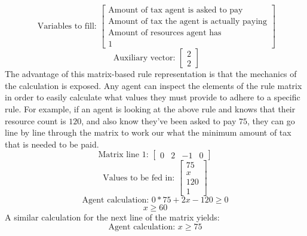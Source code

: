 \begin{equation}
    \textrm{   Variables to fill:  }
    \begin{bmatrix}
        \textrm{Amount of tax agent is asked to pay} \\
        \textrm{Amount of tax the agent is actually paying} \\
        \textrm{Amount of resources agent has} \\
        1
    \end{bmatrix}     
\end{equation}
\begin{equation}
    \textrm{   Auxiliary vector: } 
    \begin{bmatrix}
        2 \\
        2 
    \end{bmatrix}   
\end{equation}
The advantage of this matrix-based rule representation is that the mechanics of the calculation is exposed. 
Any agent can inspect the elements of the rule matrix in order to easily calculate what values they must provide to adhere to a specific rule.
For example, if an agent is looking at the above rule and knows that their resource count is $120$, and also know they've been asked to pay $75$, they can go line by line through the matrix to work our what the minimum amount of tax that is needed to be paid.
\begin{equation}
    \textrm{Matrix line 1: }
    \begin{bmatrix}
        0 & 2 & -1 & 0
    \end{bmatrix}
\end{equation}
\begin{equation}
    \textrm{Values to be fed in: }
    \begin{bmatrix}
        75 \\
        x \\
        120 \\
        1
    \end{bmatrix}
\end{equation}
\begin{equation}
    \textrm{Agent calculation: }
    0*75 + 2x -120 \geq 0
\end{equation}
\begin{equation}
    x \geq 60
\end{equation}
A similar calculation for the next line of the matrix yields:
\begin{equation}
    \textrm{Agent calculation: }
    x \geq 75
\end{equation}
